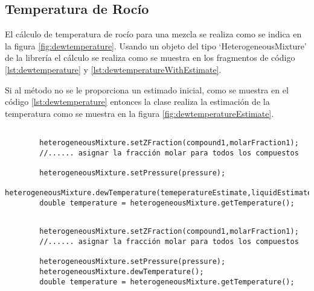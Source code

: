 \subsection{Temperatura de Rocío}\label{subsec:dewtemperature}

	El cálculo de temperatura de rocío para una mezcla se realiza como se indica en la figura \ref{fig:dewtemperature}. Usando un objeto del tipo `HeterogeneousMixture' de la librería \Materia el cálculo se realiza como se muestra en los fragmentos de código \ref{lst:dewtemperature} y \ref{lst:dewtemperatureWithEstimate}.

	Si al método no se le proporciona un estimado inicial, como se muestra en el código \ref{lst:dewtemperature} entonces la clase realiza la estimación de la temperatura como se muestra en la figura \ref{fig:dewtemperatureEstimate}. 

	\begin{lstlisting}[label={lst:dewtemperatureWithEstimate},caption={Cálculo de la temperatura de rocío proporcionando un estimado inicial.}]

		heterogeneousMixture.setZFraction(compound1,molarFraction1);
		//...... asignar la fracción molar para todos los compuestos

		heterogeneousMixture.setPressure(pressure);
		heterogeneousMixture.dewTemperature(temeperatureEstimate,liquidEstimatedFractions);
		double temperature = heterogeneousMixture.getTemperature();
	\end{lstlisting}


	\begin{lstlisting}[label={lst:dewtemperature},caption={Cálculo de la temperatura de rocío.}]

		heterogeneousMixture.setZFraction(compound1,molarFraction1);
		//...... asignar la fracción molar para todos los compuestos

		heterogeneousMixture.setPressure(pressure);
		heterogeneousMixture.dewTemperature();
		double temperature = heterogeneousMixture.getTemperature();
	\end{lstlisting}


